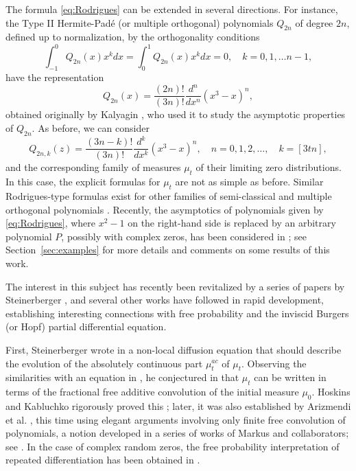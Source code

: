 \documentclass[reqno,11pt]{amsart}
\theoremstyle{plain}
\theoremstyle{definition}
\theoremstyle{remark}
\numberwithin{equation}{section}
\numberwithin{equation}{section}
\begin{document}
The formula \eqref{eq:Rodrigues} can be extended in several directions. For instance, the Type II  Hermite-Pad\'e (or multiple orthogonal) polynomials $Q_{2 n}$ of degree $2n$, defined up to normalization, by the orthogonality conditions
 \begin{equation} \label{eq:HP}
 	\int_{-1}^0 Q_{2 n}(x) x^k d x=  \int_0^1 Q_{2 n}(x) x^k d x=0, \quad k=0,1, \dots n-1,
 \end{equation}
 have the representation
 \begin{equation}
     \label{Kalyaginexample}
 Q_{2 n}(x)= \frac{(2n)!}{(3n)!}\frac{d^n}{d x^n}\left(x^3-x\right)^n,
  \end{equation}
obtained originally by Kalyagin \cite{kaliaguine:1981}, who used it to study the asymptotic properties of $Q_{2 n}$. As before, we can consider 
$$
Q_{2n,k} (z)=\frac{(3n-k)!}{(3n)!}\frac{d^k}{d x^k}\left(x^3-x\right)^n, \quad n=0,1,2,\dots, \quad k=[3 t n], 
$$
and the corresponding family of measures $\mu_t$ of their limiting zero distributions. In this case, the explicit formulas for $\mu_t$ are not as simple as before. 
Similar Rodrigues-type formulas exist for other families of semi-classical and multiple orthogonal polynomials \cite{Aptekarev:97, MR4582606, MR4582563}. Recently, the asymptotics of polynomials given by \eqref{eq:Rodrigues}, where $x^2-1$ on the right-hand side is replaced by an arbitrary polynomial $P$, possibly with complex zeros, has been considered in \cite{ShapiroRodrigues}; see Section~\ref{sec:examples} for more details and comments on some results of this work.

The interest in this subject has recently been revitalized by a series of papers by Steinerberger \cite{MR4242313, MR4011508, Steiner2021}, and several other works have followed in rapid development, establishing interesting connections with free probability and the inviscid Burgers (or Hopf) partial differential equation. 

First, Steinerberger wrote in \cite{MR4011508} a non-local diffusion equation that should describe the evolution of the absolutely continuous part $\mu_t^{ac} $ of $\mu_t$. Observing the similarities with an equation in \cite{ShlyakhtenkoTao21}, he conjectured in \cite{Steiner2021} that $\mu_t$ can be written in terms of the fractional free additive convolution of the initial measure $\mu_0$. Hoskins and Kabluchko rigorously proved this \cite{HoskinsKabluchko21}; later, it was also established by Arizmendi et al. \cite{Arizmendi21}, this time using elegant arguments involving only finite free convolution of polynomials, a notion developed in a series of works of Markus and collaborators; see \cite{MR4408504}. In the case of complex random zeros, the free probability interpretation of repeated differentiation has been obtained in \cite{campbell2023fractional}. 
\end{document}
